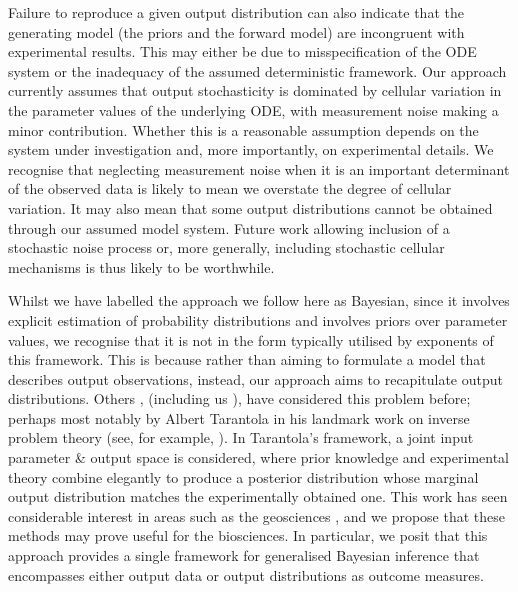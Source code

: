 Failure to reproduce a given output distribution can also indicate that the generating model (the priors and the forward model) are incongruent with experimental results. This may either be due to misspecification of the ODE system or the inadequacy of the assumed deterministic framework. Our approach currently assumes that output stochasticity is dominated by cellular variation in the parameter values of the underlying ODE, with measurement noise making a minor contribution. Whether this is a reasonable assumption depends on the system under investigation and, more importantly, on experimental details. We recognise that neglecting measurement noise when it is an important determinant of the observed data is likely to mean we overstate the degree of cellular variation. It may also mean that some output distributions cannot be obtained through our assumed model system. Future work allowing inclusion of a stochastic noise process or, more generally, including stochastic cellular mechanisms is thus likely to be worthwhile.

Whilst we have labelled the approach we follow here as Bayesian, since it involves explicit estimation of probability distributions and involves priors over parameter values, we recognise that it is not in the form typically utilised by exponents of this framework. This is because rather than aiming to formulate a model that describes output observations, instead, our approach aims to recapitulate output distributions. Others \cite{BJW-18}, (including us \cite{lambert2018inverse}), have considered this problem before; perhaps most notably by Albert Tarantola in his landmark work on inverse problem theory (see, for example, \cite{tarantola2005inverse}). In Tarantola's framework, a joint input parameter \& output space is considered, where prior knowledge and experimental theory combine elegantly to produce a posterior distribution whose marginal output distribution matches the experimentally obtained one. This work has seen considerable interest in areas such as the geosciences \cite{mosegaard1995monte,vukicevic2008analysis}, and we propose that these methods may prove useful for the biosciences. In particular, we posit that this approach provides a single framework for generalised Bayesian inference that encompasses either output data or output distributions as outcome measures.

